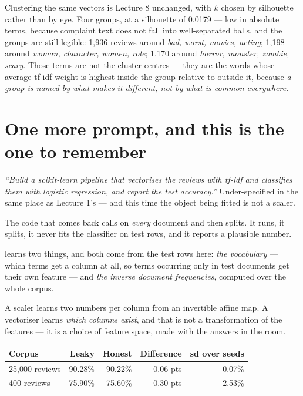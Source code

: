 \documentclass[11pt,a4paper]{article}
\begin{document}
Clustering the same vectors is Lecture 8 unchanged, with $k$ chosen by
silhouette rather than by eye. Four groups, at a silhouette of 0.0179 --- low
in absolute terms, because complaint text does not fall into well-separated
balls, and the groups are still legible: 1{,}936 reviews around \emph{bad,
worst, movies, acting}; 1{,}198 around \emph{woman, character, women, role};
1{,}170 around \emph{horror, monster, zombie, scary}. Those terms are not the
cluster centres --- they are the words whose average tf-idf weight is highest
inside the group relative to outside it, because \emph{a group is named by what
makes it different, not by what is common everywhere}.

\section{One more prompt, and this is the one to remember}

\emph{``Build a scikit-learn pipeline that vectorises the reviews with tf-idf
and classifies them with logistic regression, and report the test accuracy.''}
Under-specified in the same place as Lecture 1's --- and this time the object
being fitted is not a scaler.

The code that comes back calls  on \emph{every} document
and then splits. It runs, it splits, it never fits the classifier on test rows,
and it reports a plausible number.

\begin{failbox}[title={Failure condition --- reviewer question 2: what was fitted, and on what?}]
 learns two things, and both come from the test rows
here: \emph{the vocabulary} --- which terms get a column at all, so terms
occurring only in test documents get their own feature --- and \emph{the
inverse document frequencies}, computed over the whole corpus.

A scaler learns two numbers per column from an invertible affine map. A
vectoriser learns \emph{which columns exist}, and that is not a transformation
of the features --- it is a choice of feature space, made with the answers in
the room.
\end{failbox}

\begin{center}
\small
\begin{tabular}{lrrrr}
\toprule
\textbf{Corpus} & \textbf{Leaky} & \textbf{Honest} & \textbf{Difference} &
\textbf{sd over seeds} \\
\midrule
25{,}000 reviews & 90.28\% & 90.22\% & 0.06 pts & 0.07\% \\
400 reviews & 75.90\% & 75.60\% & 0.30 pts & 2.53\% \\
\bottomrule
\end{tabular}
\end{center}
\end{document}

